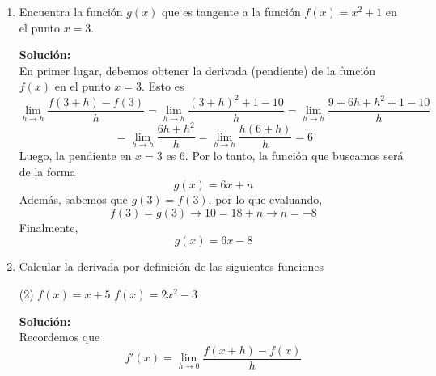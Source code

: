 \documentclass[12pt]{article}
\newenvironment{solucion}
{\begin{mdframed}[backgroundcolor=black!10]
		{\bf Solución:}\\
	}
	{
	\end{mdframed}
}
\newenvironment{preguntas}
{\begin{enumerate}\itemsep12pt
	}
	{
	\end{enumerate}
}
\newcommand{\ra}{\rightarrow}
\begin{document}
\begin{preguntas}
\begin{solucion}
\begin{enumerate}[a)]
\item En primer lugar, veamos las asíntotas verticales. Todas las discontinuidades de la función serán los candidatos a asíntotas verticales.\\
\\
En este caso, esto corresponde solo a $x=-2$. Veamos si el límite existe en $x=-2$
$$\lim\limits_{x\ra -2} \dfrac{9-x^2}{x+2} = \dfrac{5}{0} = \infty = \not \exists$$
Como el límite no existe, entonces la función no posee asíntota vertical.\\
\\
Ahora, veamos las asíntotas horizontales
\item En primer lugar, veamos las asíntotas verticales. Notemos que
$$f(x) = \dfrac{x^2-5x+6}{x^2+2x-8} = \dfrac{(x-2)(x-3)}{(x+4)(x-2)}$$
Luego, nuestros candidatos son $x=2$ y $x=-4$
$$\lim\limits_{x\ra 2} \dfrac{(x-2)(x-3)}{(x+4)(x-2)} = \lim\limits_{x\ra 2} \dfrac{x-3}{x+4} = -\dfrac{1}{6}$$ 
$$\lim\limits_{x\ra -4} \dfrac{(x-2)(x-3)}{(x+4)(x-2)} = \lim\limits_{x\ra -4} \dfrac{x-3}{x+4} = -\dfrac{1}{0} = -\infty = \not\exists$$ 
Por lo tanto, la función posee una asíntota vertical en $x=-4$
\end{enumerate}
\end{solucion}
\item Encuentra la función $g(x)$ que es tangente a la función $f(x) = x^2 + 1$ en el punto $x = 3$.
\begin{solucion}
En primer lugar, debemos obtener la derivada (pendiente) de la función $f(x)$ en el punto $x=3$. Esto es
$$\lim\limits_{h\ra h} \dfrac{f(3+h) - f(3)}{h} =
\lim\limits_{h\ra h} \dfrac{(3+h)^2+1 - 10}{h} =
\lim\limits_{h\ra h} \dfrac{9+6h+h^2+1 - 10}{h}$$
$$=
\lim\limits_{h\ra h} \dfrac{6h+h^2}{h} =
\lim\limits_{h\ra h} \dfrac{h(6+h)}{h} = 
6
$$
Luego, la pendiente en $x=3$ es $6$. Por lo tanto, la función que buscamos será de la forma
$$g(x) = 6x + n$$
Además, sabemos que $g(3) = f(3)$, por lo que evaluando,
$$f(3) = g(3) \ra 10 = 18 + n \ra n = -8$$
Finalmente,
$$g(x) = 6x - 8$$
\end{solucion}
\item Calcular la derivada por definición de las siguientes funciones
\begin{tasks}(2)
\task $f(x) = x+5$
\task $f(x) = 2x^2-3$
\end{tasks}
\begin{solucion}
Recordemos que 
	$$f'(x) = \lim\limits_{h \ra 0} \dfrac{f(x+h) - f(x)}{h}$$
\begin{enumerate}[a)]

\end{enumerate}
\end{solucion}
\end{preguntas}
\end{document}
